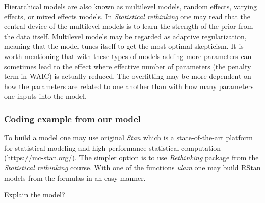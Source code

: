 \documentclass[
  10pt,
  dvipsnames,enabledeprecatedfontcommands, twocolumn]{scrartcl}
\begin{document}
Hierarchical models are also known as multilevel models, random effects,
varying effects, or mixed effects models. In
\textit{Statistical rethinking} one may read that the central device of
the multilevel models is to learn the strength of the prior from the
data itself. Multilevel models may be regarded as adaptive
regularization, meaning that the model tunes itself to get the most
optimal skepticism. It is worth mentioning that with these types of
models adding more parameters can sometimes lead to the effect where
effective number of parameters (the penalty term in WAIC) is actually
reduced. The overfitting may be more dependent on how the parameters are
related to one another than with how many parameters one inputs into the
model.

\hypertarget{coding-example-from-our-model}{%
\subsubsection{Coding example from our
model}\label{coding-example-from-our-model}}

To build a model one may use original \textit{Stan} which is a
state-of-the-art platform for statistical modeling and high-performance
statistical computation (\url{https://mc-stan.org/}). The simpler option
is to use \textit{Rethinking} package from the
\textit{Statistical rethinking} course. With one of the functions
\textit{ulam} one may build RStan models from the formulas in an easy
manner.

Explain the model?
\end{document}
